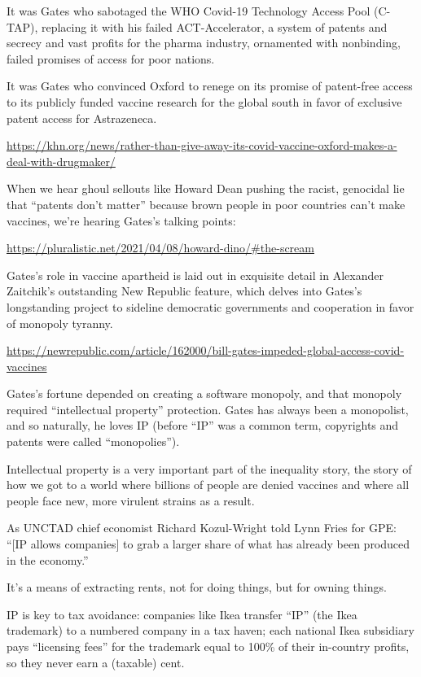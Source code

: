 \documentclass[
]{book}
\begin{document}
It was Gates who sabotaged the WHO Covid-19 Technology Access Pool (C-TAP), replacing it with his failed ACT-Accelerator, a system of patents and secrecy and vast profits for the pharma industry, ornamented with nonbinding, failed promises of access for poor nations.

It was Gates who convinced Oxford to renege on its promise of patent-free access to its publicly funded vaccine research for the global south in favor of exclusive patent access for Astrazeneca.

\url{https://khn.org/news/rather-than-give-away-its-covid-vaccine-oxford-makes-a-deal-with-drugmaker/}

When we hear ghoul sellouts like Howard Dean pushing the racist, genocidal lie that ``patents don't matter'' because brown people in poor countries can't make vaccines, we're hearing Gates's talking points:

\url{https://pluralistic.net/2021/04/08/howard-dino/\#the-scream}

Gates's role in vaccine apartheid is laid out in exquisite detail in Alexander Zaitchik's outstanding New Republic feature, which delves into Gates's longstanding project to sideline democratic governments and cooperation in favor of monopoly tyranny.

\url{https://newrepublic.com/article/162000/bill-gates-impeded-global-access-covid-vaccines}

Gates's fortune depended on creating a software monopoly, and that monopoly required ``intellectual property'' protection. Gates has always been a monopolist, and so naturally, he loves IP (before ``IP'' was a common term, copyrights and patents were called ``monopolies'').

Intellectual property is a very important part of the inequality story, the story of how we got to a world where billions of people are denied vaccines and where all people face new, more virulent strains as a result.

As UNCTAD chief economist Richard Kozul-Wright told Lynn Fries for GPE: ``{[}IP allows companies{]} to grab a larger share of what has already been produced in the economy.''

It's a means of extracting rents, not for doing things, but for owning things.

IP is key to tax avoidance: companies like Ikea transfer ``IP'' (the Ikea trademark) to a numbered company in a tax haven; each national Ikea subsidiary pays ``licensing fees'' for the trademark equal to 100\% of their in-country profits, so they never earn a (taxable) cent.
\end{document}
